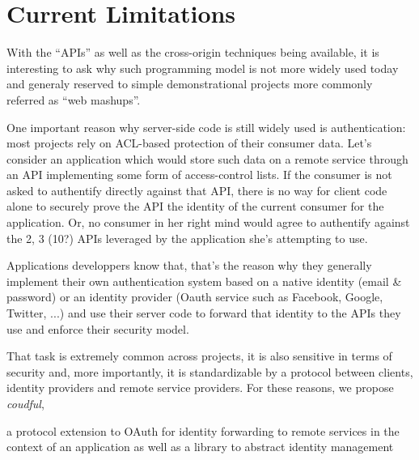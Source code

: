 
\section{Current Limitations}

With the ``APIs'' as well as the cross-origin techniques being available,
it is interesting to ask why such programming model is not more widely
used today and generaly reserved to simple demonstrational projects more
commonly referred as ``web mashups''. 

One important reason why server-side code is still widely used is
authentication: most projects rely on ACL-based protection of
their consumer data. Let's consider an application which would store
such data on a remote service through an API implementing some form of
access-control lists. If the consumer is not asked to authentify directly against
that API, there is no way for client code alone to securely prove the API
the identity of the current consumer for the application. Or,
no consumer in her right mind would agree to authentify against the 2,
3 (10?) APIs leveraged by the application she's attempting to use.

Applications developpers know that, that's the reason why they
generally implement their own authentication system based on a native
identity (email & password) or an identity provider (Oauth service such
as Facebook, Google, Twitter, ...) and use their server code to
forward that identity to the APIs they use and enforce their security
model.

That task is extremely common across projects, it is also sensitive in
terms of security and, more importantly, it is standardizable by a protocol
between clients, identity providers and remote service providers. For
these reasons, we propose \emph{coudful}, 

a protocol extension to
OAuth for identity forwarding to remote services in the context of an
application as well as a library to abstract identity management 


